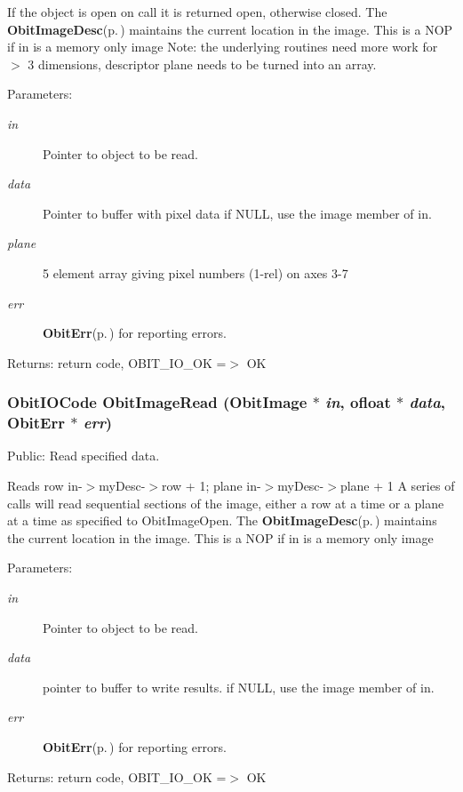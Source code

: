 If the object is open on call it is returned open, otherwise closed. The {\bf Obit\-Image\-Desc}{\rm (p.\,\pageref{structObitImageDesc})} maintains the current location in the image. This is a NOP if in is a memory only image Note: the underlying routines need more work for $>$ 3 dimensions, descriptor plane needs to be turned into an array. \begin{Desc}
\item[Parameters:]
\begin{description}
\item[{\em in}]Pointer to object to be read. \item[{\em data}]Pointer to buffer with pixel data if NULL, use the image member of in. \item[{\em plane}]5 element array giving pixel numbers (1-rel) on axes 3-7 \item[{\em err}]{\bf Obit\-Err}{\rm (p.\,\pageref{structObitErr})} for reporting errors. \end{description}
\end{Desc}
\begin{Desc}
\item[Returns:]return code, OBIT\_\-IO\_\-OK =$>$ OK \end{Desc}
\subsubsection{\setlength{\rightskip}{0pt plus 5cm}Obit\-IOCode Obit\-Image\-Read ({\bf Obit\-Image} $\ast$ {\em in}, {\bf ofloat} $\ast$ {\em data}, {\bf Obit\-Err} $\ast$ {\em err})}\label{ObitImage_8h_a31}


Public: Read specified data. 

Reads row in-$>$my\-Desc-$>$row + 1; plane in-$>$my\-Desc-$>$plane + 1 A series of calls will read sequential sections of the image, either a row at a time or a plane at a time as specified to Obit\-Image\-Open. The {\bf Obit\-Image\-Desc}{\rm (p.\,\pageref{structObitImageDesc})} maintains the current location in the image. This is a NOP if in is a memory only image \begin{Desc}
\item[Parameters:]
\begin{description}
\item[{\em in}]Pointer to object to be read. \item[{\em data}]pointer to buffer to write results. if NULL, use the image member of in. \item[{\em err}]{\bf Obit\-Err}{\rm (p.\,\pageref{structObitErr})} for reporting errors. \end{description}
\end{Desc}
\begin{Desc}
\item[Returns:]return code, OBIT\_\-IO\_\-OK =$>$ OK \end{Desc}

